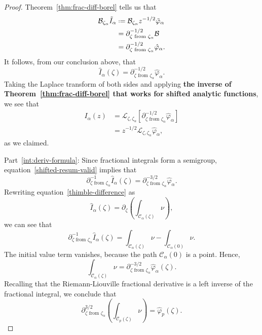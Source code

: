 \documentclass[11pt,a4paper,twoside,leqno,noamsfonts]{amsart}
\numberwithin{equation}{section}
\newcommand{\laplace}{\mathcal{L}}
\begin{document}
\begin{proof}
Theorem~\ref{thm:frac-diff-borel} tells us that
\begin{align*}
\mathcal{B}_{\zeta_\alpha} \tilde{I}_\alpha & \defeq \mathcal{B}_{\zeta_\alpha} z^{-1/2} \tilde{\varphi}_\alpha \\
& = \partial^{-1/2}_{\zeta \text{ from } \zeta_\alpha} \mathcal{B} \\
& = \partial^{-1/2}_{\zeta \text{ from } \zeta_\alpha} \hat{\varphi}_\alpha.
\end{align*}
It follows, from our conclusion above, that
\begin{equation}\label{shifted-resum-valid}
\hat{I}_\alpha(\zeta) = \partial^{-1/2}_{\zeta \text{ from } \zeta_\alpha} \hat{\varphi}_\alpha.
\end{equation}
Taking the Laplace transform of both sides and applying \textbf{the inverse of Theorem~\ref{thm:frac-diff-borel} that works for shifted analytic functions}, we see that
\begin{align*}
I_\alpha(z) & = \laplace_{\zeta, \zeta_\alpha} \left[ \partial^{-1/2}_{\zeta \text{ from } \zeta_\alpha} \hat{\varphi}_\alpha \right] \\
& = z^{-1/2} \laplace_{\zeta, \zeta_\alpha} \hat{\varphi}_\alpha,
\end{align*}
as we claimed.

Part~\eqref{int:deriv-formula}: Since fractional integrals form a semigroup, equation~\eqref{shifted-resum-valid} implies that
\[ \partial^{-1}_{\zeta \text{ from } \zeta_\alpha} \hat{I}_\alpha(\zeta) = \partial^{-3/2}_{\zeta \text{ from } \zeta_\alpha} \hat{\varphi}_\alpha. \]
Rewriting equation~\eqref{thimble-difference} as
\[ \hat{I}_\alpha(\zeta) = \partial_\zeta \left( \int_{\mathcal{C}_\alpha(\zeta)} \nu \right), \]
we can see that
\[ \partial^{-1}_{\zeta \text{ from } \zeta_\alpha} \hat{I}_\alpha(\zeta) = \int_{\mathcal{C}_\alpha(\zeta)} \nu - \int_{\mathcal{C}_\alpha(0)} \nu. \]
The initial value term vanishes, because the path $\mathcal{C}_\alpha(0)$ is a point. Hence,
\[ \int_{\mathcal{C}_\alpha(\zeta)} \nu = \partial^{-3/2}_{\zeta \text{ from } \zeta_\alpha} \hat{\varphi}_\alpha(\zeta). \]
Recalling that the Riemann-Liouville fractional derivative is a left inverse of the fractional integral, we conclude that
\[ \partial^{3/2}_{\zeta \text{ from } \zeta_\alpha} \left( \int_{\mathcal{C}_p(\zeta)} \nu \right) = \hat{\varphi}_p(\zeta). \]
\end{proof}
\end{document}
